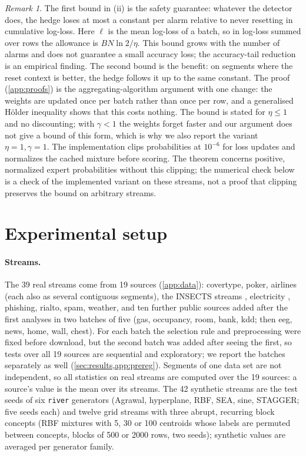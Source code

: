 \documentclass[10pt]{article}
\theoremstyle{definition}
\theoremstyle{remark}
\newtheorem{remark}{Remark}
\begin{document}
\begin{remark}
The first bound in (ii) is the safety guarantee: whatever the detector does, the hedge loses at most a constant per
alarm relative to never resetting in cumulative log-loss. Here $\ell$ is the mean log-loss of a batch, so in log-loss
summed over rows the allowance is $BN\ln2/\eta$. This bound grows with the number of alarms and does not
guarantee a small accuracy loss; the accuracy-tail reduction is an empirical finding. The second bound is the
benefit: on segments where the reset context is better, the hedge follows it up to the same constant. The proof
(\cref{app:proofs}) is the aggregating-algorithm argument \citep{vovk1990aggregating} with one change: the weights are
updated once per batch rather than once per row, and a generalised H\"older inequality shows that this costs nothing.
The bound is stated for $\eta\le1$ and no discounting; with $\gamma<1$ the weights forget faster and our argument
does not give a bound of this form, which is why we also report the variant $\eta=1,\gamma=1$. The implementation clips probabilities
at $10^{-6}$ for loss updates and normalizes the cached mixture before scoring. The theorem concerns positive,
normalized expert probabilities without this clipping; the numerical check below is a check of the implemented
variant on these streams, not a proof that clipping preserves the bound on arbitrary streams.
\end{remark}

\section{Experimental setup}
\label{sec:setup}

\paragraph{Streams.} The 39 real streams come from 19 sources (\cref{app:data}): covertype, poker, airlines (each also as
several contiguous segments), the INSECTS streams \citep{souza2020insects}, electricity \citep{harries1999elec2},
phishing, rialto, spam, weather, and ten further public sources added after the first analyses in two batches of five (gas, occupancy,
room, bank, kdd; then eeg, news, home, wall, chest). For each batch the selection rule and preprocessing were fixed
before download, but the second batch was added after seeing the first, so tests over all 19 sources are sequential
and exploratory; we report the batches separately as well (\cref{sec:results,app:prereg}). Segments of one data set are not independent, so all statistics on real
streams are computed over the 19 sources: a source's value is the mean over its streams. The 42 synthetic streams are
the test seeds of six \texttt{river} generators (Agrawal, hyperplane, RBF, SEA, sine, STAGGER; five seeds each) and
twelve grid streams with three abrupt, recurring block concepts (RBF mixtures with 5, 30 or 100 centroids whose
labels are permuted between concepts, blocks of 500 or 2000 rows, two seeds); synthetic values are averaged per generator family.
\end{document}
